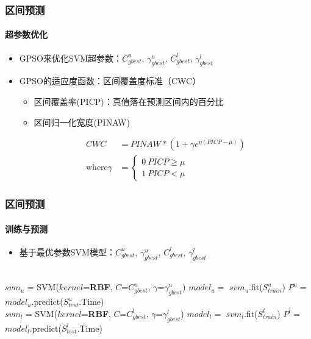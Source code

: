 \begin{frame}[allowframebreaks]
\frametitle{区间预测}
\framesubtitle{超参数优化}
\begin{itemize}
    \item GPSO来优化SVM超参数：$C^u_{gbest}$, $\gamma^u_{gbest}$, $C^l_{gbest}$, $\gamma^l_{gbest}$
    \item GPSO的适应度函数：区间覆盖度标准（CWC）
        \begin{itemize}
            \item 区间覆盖率(PICP)：真值落在预测区间内的百分比
            \item 区间归一化宽度(PINAW)
        \end{itemize}
       \begin{equation}
                   \begin{aligned}
                       CWC &= PINAW * (1 + \gamma e^{\eta(PICP-\mu)}) \\
                       \text{where} \gamma &=
                                       \left\{
                                           \begin{array}{rcl}
                                           0 \ PICP \geq \mu \\
                                           1 \ PICP < \mu
                                           \end{array}
                                       \right.
                   \end{aligned}
               \end{equation}
\end{itemize}
\end{frame}

\begin{frame}
\frametitle{区间预测}
\framesubtitle{训练与预测}
\begin{itemize}
    \item 基于最优参数SVM模型：$C^u_{gbest}$, $\gamma^u_{gbest}$, $C^l_{gbest}$, $\gamma^l_{gbest}$
\end{itemize}
\begin{algorithmic}[1]
    \\
    \State $svm_u$ = SVM($kernel$=\textbf{RBF}, $C$=$C^u_{gbest}$, $\gamma$=$\gamma^u_{gbest}$)
    \State $model_u =$ $svm_u$.fit($S^u_{train}$) 
    \State $P^u =$ $model_u$.predict($S^u_{test}$.Time) 
    \\
    \State $svm_l$ = SVM($kernel$=\textbf{RBF}, $C$=$C^l_{gbest}$, $\gamma$=$\gamma^l_{gbest}$)
    \State $model_l =$ $svm_l$.fit($S^l_{train}$) 
    \State $P^l =$ $model_l$.predict($S^l_{test}$.Time) \\
\end{algorithmic}
\end{frame}

